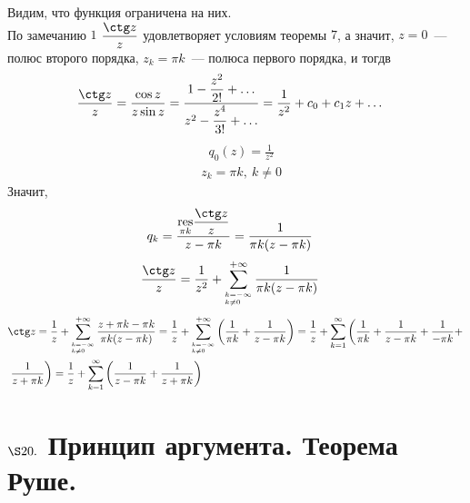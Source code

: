 Видим, что функция ограничена на них.
\\
По замечанию $1$ $\dst \frac{\ctg z}{z}$ удовлетворяет условиям теоремы $7$, а
значит, $z = 0$~--- полюс второго порядка, $z_k = \pi k$~--- полюса первого
порядка, и тогдв
\begin{align*}
  & \frac{\ctg z}{z} = \frac{\cos z}{z \sin z} = \frac{1 - \dst \frac{z^2}{2!} +\dots}{z^2 - \dst \frac{z^4}{3!}+\dots} = \frac{1}{z^2} +c_0 + c_1z + \dots
\end{align*}
\begin{align*}
  & q_0(z) = \frac{1}{z^2}
\end{align*}
\begin{align*}
  & z_k = \pi k, \ k \neq 0
\end{align*}
Значит,
\begin{align*}
  &  q_k = \frac{\us{\pi k}{\res}\dst \frac{\ctg z}{z}}{z - \pi k} = \frac{1}{\pi k (z - \pi k)}
\end{align*}
\begin{align*}
  & \frac{\ctg z}{z} = \frac{1}{z^2} +\sum_{^{k=-\infty}_{k \neq 0}}^{+\infty}\frac{1}{\pi k (z-\pi k)}
\end{align*}
\begin{align*}
  & \ctg z = \frac{1}{z} +\sum_{^{k=-\infty}_{k \neq 0}}^{+\infty}\frac{z+\pi k -\pi k}{\pi k (z-\pi k)} = \frac{1}{z} +\sum_{^{k=-\infty}_{k \neq 0}}^{+\infty}\left( \frac{1}{\pi k} + \frac{1}{z-\pi k}\right) = \frac{1}{z} +\sum_{k=1}^{\infty}\left( \frac{1}{\pi k} + \frac{1}{z-\pi k} + \frac{1}{-\pi k} + \right. \\
  &\left. \frac{1}{z+\pi k}\right) = \frac{1}{z} +\sum_{k=1}^{\infty}\left( \frac{1}{z-\pi k} + \frac{1}{z+\pi k}\right)
\end{align*}

\section{$\S 20.$ Принцип аргумента. Теорема Руше.}
